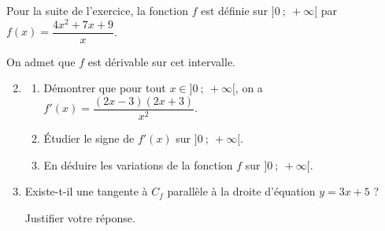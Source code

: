 Pour la suite de l'exercice, la fonction $f$ est définie sur $]0\ ;\ +\infty[$ par $f(x)=\dfrac{4x^2+7x+9}{x}$.

On admet que $f$ est dérivable sur cet intervalle.

\begin{enumerate}
\setcounter{enumi}{1}
\item \begin{enumerate}
\item Démontrer que pour tout $x\in]0\ ;\ +\infty[$, on a $f'(x)=\dfrac{(2x-3)(2x+3)}{x^2}$.
\item Étudier le signe de $f'(x)$ sur $]0\ ;\ +\infty[$.
\item En déduire les variations de la fonction $f$ sur $]0\ ;\ +\infty[$.
\end{enumerate}
\item Existe-t-il une tangente à $C_f$ parallèle à la droite d'équation $y=3x+5$ ?

Justifier votre réponse.
\end{enumerate}
